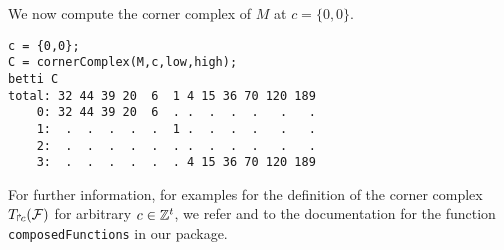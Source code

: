 \documentclass[twoside,12pt, leqno]{amsart}
\def\cornerT#1{{T_{\Rsh \kern -1pt #1}}}
\def\frank#1{{\bf *** Frank:} #1 {\bf ***}}
\begin{document}
{\noindent
We now compute the corner complex of $M$ at $c=\{0,0\}$.
{\small \begin{verbatim}
c = {0,0};
C = cornerComplex(M,c,low,high);
betti C
total: 32 44 39 20  6  1 4 15 36 70 120 189
    0: 32 44 39 20  6  . .  .  .  .   .   .
    1:  .  .  .  .  .  1 .  .  .  .   .   .
    2:  .  .  .  .  .  . .  .  .  .   .   .
    3:  .  .  .  .  .  . 4 15 36 70 120 189
\end{verbatim}

\noindent
For further information, for examples for the definition of the corner complex $\cornerT c (\sF)$ for arbitrary $c \in {\mathbb Z}^t$, we refer \cite[Section 3]{EES} and to  the documentation for the function  {\tt composedFunctions}
 in our package.
%
%


\begin{bibdiv}
\begin{biblist}



\end{biblist}
\end{bibdiv}}}
\end{document}
